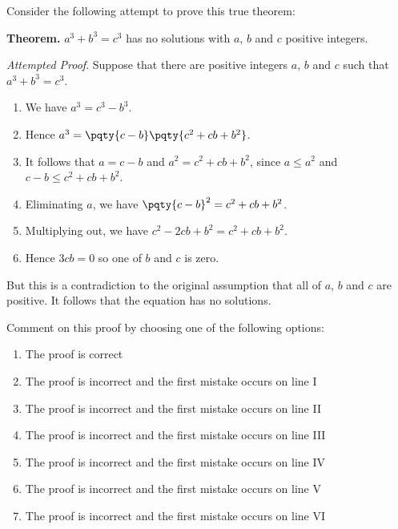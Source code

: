 \documentclass{article}
\begin{document}
\begin{example}[TMUA 2017 P2 Q9]
    Consider the following attempt to prove this true theorem:

    \textbf{Theorem.} \(a^3 + b^3 = c^3\) has no solutions with \(a\), \(b\) and \(c\) positive integers.

    \textit{Attempted Proof}. Suppose that there are positive integers \(a\), \(b\) and \(c\) such that \(a^3 + b^3 = c^3\).

    \begin{enumerate}[label=\Roman*.]
        \item We have \(a^3 = c^3 - b^3\).
        \item Hence \(a^3 = \pqty{c - b}\pqty{c^2 + cb + b^2}\).
        \item It follows that \(a = c - b\) and \(a^2 = c^2 + cb + b^2\), since \(a \leq a^2\) and \(c - b \leq c^2 + cb + b^2\).
        \item Eliminating \(a\), we have \(\pqty{c - b}^2 = c^2 + cb + b^2\).
        \item Multiplying out, we have \(c^2 - 2cb + b^2 = c^2 + cb + b^2\).
        \item Hence \(3cb = 0\) so one of \(b\) and \(c\) is zero.
    \end{enumerate}

    But this is a contradiction to the original assumption that all of \(a\), \(b\) and \(c\) are positive. It follows that the equation has no solutions.

    Comment on this proof by choosing one of the following options:
        
\begin{enumerate}[label=\Alph*.]
    \item The proof is correct
    \item The proof is incorrect and the first mistake occurs on line I
    \item The proof is incorrect and the first mistake occurs on line II
    \item The proof is incorrect and the first mistake occurs on line III
    \item The proof is incorrect and the first mistake occurs on line IV
    \item The proof is incorrect and the first mistake occurs on line V
    \item The proof is incorrect and the first mistake occurs on line VI
\end{enumerate}
\end{example}
\end{document}
